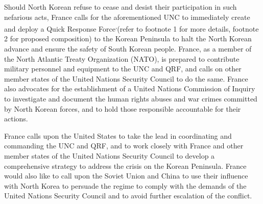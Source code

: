 \documentclass[a4paper,12pt]{article}
\begin{document}
Should North Korean refuse to cease and desist their participation in such nefarious acts, France calls for the aforementioned UNC to immediately create and deploy a Quick Response Force\footnotemark[1]\textsuperscript{,}\footnotemark[2] (refer to footnote 1 for more details, footnote 2 for proposed composition) to the Korean Peninsula to halt the North Korean advance and ensure the safety of South Korean people. France, as a member of the North Atlantic Treaty Organization (NATO), is prepared to contribute military personnel and equipment to the UNC and QRF, and calls on other member states of the United Nations Security Council to do the same. France also advocates for the establishment of a United Nations Commission of Inquiry to investigate and document the human rights abuses and war crimes committed by North Korean forces, and to hold those responsible accountable for their actions.

France calls upon the United States to take the lead in coordinating and commanding the UNC and QRF, and to work closely with France and other member states of the United Nations Security Council to develop a comprehensive strategy to address the crisis on the Korean Peninsula. France would also like to call upon the Soviet Union and China to use their influence with North Korea to persuade the regime to comply with the demands of the United Nations Security Council and to avoid further escalation of the conflict.

\newpage
\end{document}
